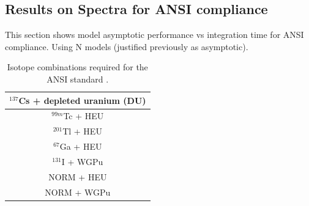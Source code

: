 


\subsection{Results on Spectra for ANSI compliance}

This section shows model asymptotic performance vs integration time for ANSI compliance. Using N models (justified previously as asymptotic). 



\begin{table}[H]
\centering
\caption{Isotope combinations required for the ANSI standard \cite{ANSI}.}
\begin{tabular}{c}
\hline
$^{137}$Cs + depleted uranium (DU) \\ \hline
$^{99m}$Tc + HEU \\ \hline
$^{201}$Tl + HEU \\ \hline
$^{67}$Ga + HEU \\ \hline
$^{131}$I + WGPu \\ \hline
NORM + HEU \\ \hline
NORM + WGPu \\ \hline
\end{tabular}
\end{table}



